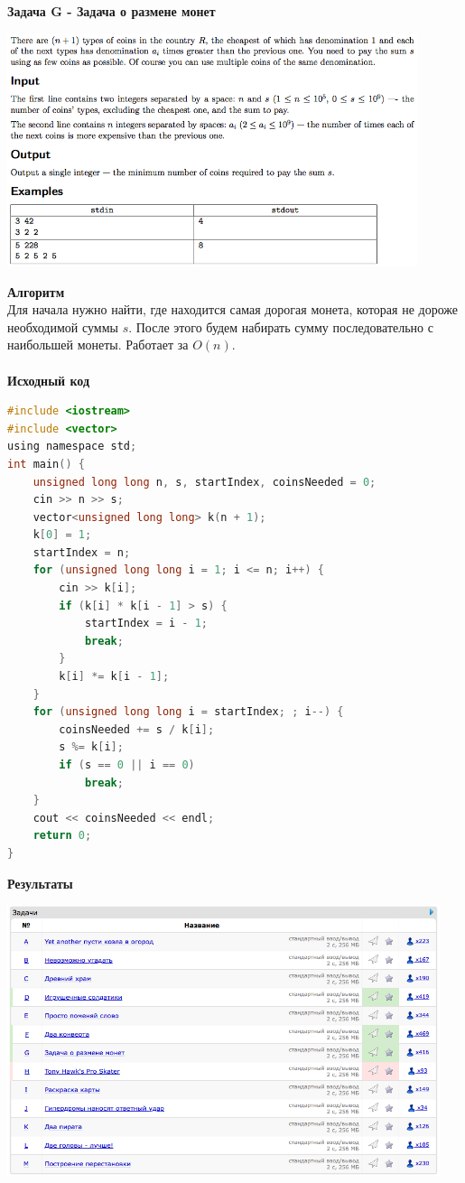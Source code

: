 \documentclass[a4paper,12pt]{article}
\begin{document}
\newpage
\textbf{{\large Задача G - Задача о размене монет}} \\
\begin{center}
\includegraphics[width=0.9\textwidth]{CT_SGAU/CT_SGAU_G.png}\\ [1cm]
\end{center}
\textbf{{\large Алгоритм}} \\
Для начала нужно найти, где находится самая дорогая монета, которая не дороже необходимой суммы $s$. После этого будем набирать сумму последовательно с наибольшей монеты. Работает за $O(n)$. \\ 
\\
\textbf{{\large Исходный код}}
\begin{lstlisting}[language=C]
#include <iostream>
#include <vector>
using namespace std;
int main() {
    unsigned long long n, s, startIndex, coinsNeeded = 0;
    cin >> n >> s;
    vector<unsigned long long> k(n + 1);
    k[0] = 1;
    startIndex = n;
    for (unsigned long long i = 1; i <= n; i++) {
        cin >> k[i];
        if (k[i] * k[i - 1] > s) {
            startIndex = i - 1;
            break;
        }
        k[i] *= k[i - 1];
    }
    for (unsigned long long i = startIndex; ; i--) {
        coinsNeeded += s / k[i];
        s %= k[i];
        if (s == 0 || i == 0)
            break;
    }
    cout << coinsNeeded << endl;
    return 0;
}
\end{lstlisting}

\newpage
\textbf{{\large Результаты}} \\
\begin{center}
\includegraphics[width=0.95\textwidth]{CT_SGAU/CT_SGAU_result.png}\\ [1cm]
\end{center}
\end{document}
